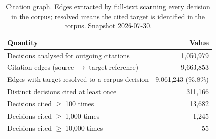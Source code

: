 \begin{table}[H]
\centering
\caption{Citation graph. Edges extracted by full-text scanning every decision in the corpus; resolved means the cited target is identified in the corpus. Snapshot 2026-07-30.}
\label{tab:citation_graph}
\small
\begin{tabular}{l r}
\toprule
\textbf{Quantity} & \textbf{Value} \\
\midrule
Decisions analysed for outgoing citations & 1,050,979 \\
Citation edges (source $\to$ target reference) & 9,663,853 \\
Edges with target resolved to a corpus decision & 9,061,243 (93.8\%) \\
Distinct decisions cited at least once & 311,166 \\
Decisions cited $\geq$ 100 times & 13,682 \\
Decisions cited $\geq$ 1{,}000 times & 1,245 \\
Decisions cited $\geq$ 10{,}000 times & 55 \\
\bottomrule
\end{tabular}
\end{table}
